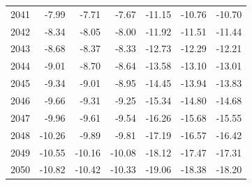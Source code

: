 \begin{table}
\begin{tabular}{lrrrrrr}
2041 & -7.99 & -7.71 & -7.67 & -11.15 & -10.76 & -10.70 \\
2042 & -8.34 & -8.05 & -8.00 & -11.92 & -11.51 & -11.44 \\
2043 & -8.68 & -8.37 & -8.33 & -12.73 & -12.29 & -12.21 \\
2044 & -9.01 & -8.70 & -8.64 & -13.58 & -13.10 & -13.01 \\
2045 & -9.34 & -9.01 & -8.95 & -14.45 & -13.94 & -13.83 \\
2046 & -9.66 & -9.31 & -9.25 & -15.34 & -14.80 & -14.68 \\
2047 & -9.96 & -9.61 & -9.54 & -16.26 & -15.68 & -15.55 \\
2048 & -10.26 & -9.89 & -9.81 & -17.19 & -16.57 & -16.42 \\
2049 & -10.55 & -10.16 & -10.08 & -18.12 & -17.47 & -17.31 \\
2050 & -10.82 & -10.42 & -10.33 & -19.06 & -18.38 & -18.20 \\
\bottomrule
\end{tabular}
\end{table}
